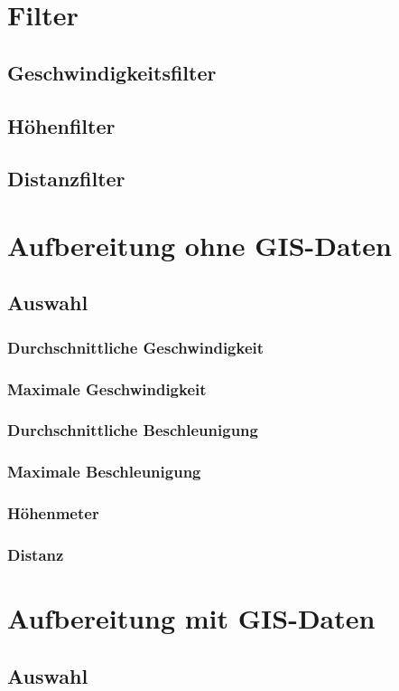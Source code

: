 \section{Filter}
\subsection{Geschwindigkeitsfilter}
\subsection{Höhenfilter}
\subsection{Distanzfilter}

\section{Aufbereitung ohne GIS-Daten}
\subsection{Auswahl}
\subsubsection{Durchschnittliche Geschwindigkeit}
\subsubsection{Maximale Geschwindigkeit}
\subsubsection{Durchschnittliche Beschleunigung}
\subsubsection{Maximale Beschleunigung}
\subsubsection{Höhenmeter}
\subsubsection{Distanz}

\section{Aufbereitung mit GIS-Daten}
\subsection{Auswahl}
